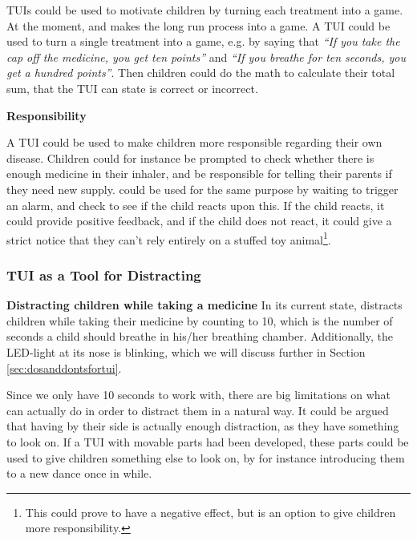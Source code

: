 TUIs could be used to motivate children by turning each treatment into a game. At the moment, \ab{} and \app{} makes the long run process into a game. A TUI could be used to turn a single treatment into a game, e.g. by saying that \textit{``If you take the cap off the medicine, you get ten points''} and \textit{``If you breathe for ten seconds, you get a hundred points''}. Then children could do the math to calculate their total sum, that the TUI can state is correct or incorrect. 


\textbf{Responsibility}

A TUI could be used to make children more responsible regarding their own disease. Children could for instance be prompted to check whether there is enough medicine in their inhaler, and be responsible for telling their parents if they need new supply. \ab{} could be used for the same purpose by waiting to trigger an alarm, and check to see if the child reacts upon this. If the child reacts, it could provide positive feedback, and if the child does not react, it could give a strict notice that they can't rely entirely on a stuffed toy animal\footnote{This could prove to have a negative effect, but is an option to give children more responsibility.}.  

\subsubsection{TUI as a Tool for Distracting}
\label{sec:tuiasatoolfordistracting}

\textbf{Distracting children while taking a medicine}
In its current state, \ab{} distracts children while taking their medicine by counting to 10, which is the number of seconds a child should breathe in his/her breathing chamber. Additionally, the LED-light at its nose is blinking, which we will discuss further in Section \ref{sec:dosanddontsfortui}. 

Since we only have 10 seconds to work with, there are big limitations on what \ab{} can actually do in order to distract them in a natural way. It could be argued that having \ab{} by their side is actually enough distraction, as they have something to look on. If a TUI with movable parts had been developed, these parts could be used to give children something else to look on, by for instance introducing them to a new dance once in while.        

